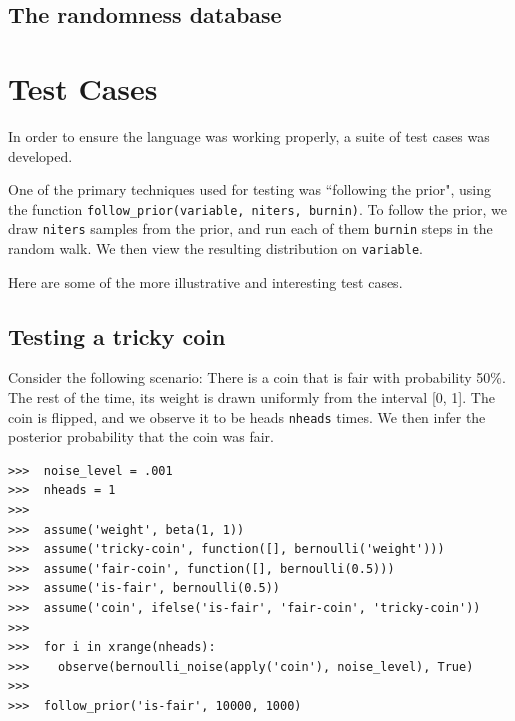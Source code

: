 \documentclass[11pt]{article}
\begin{document}


\subsection{The randomness database}


\pagebreak

\section{Test Cases}

In order to ensure the language was working properly, a suite of test cases was developed.  

One of the primary techniques used for testing was ``following the prior", using the function {\tt follow\_prior(variable, niters, burnin)}.  To follow the prior, we draw {\tt niters} samples from the prior, and run each of them {\tt burnin} steps in the random walk.  We then view the resulting distribution on {\tt variable}.  %

Here are some of the more illustrative and interesting test cases.


\subsection{Testing a tricky coin}

Consider the following scenario:  There is a coin that is fair with probability 50\%.  The rest of the time, its weight is drawn uniformly from the interval [0, 1].  The coin is flipped, and we observe it to be heads {\tt nheads} times.  We then infer the posterior probability that the coin was fair. 

\begin{small}
\begin{verbatim}
>>>  noise_level = .001
>>>  nheads = 1
>>>  
>>>  assume('weight', beta(1, 1))
>>>  assume('tricky-coin', function([], bernoulli('weight')))
>>>  assume('fair-coin', function([], bernoulli(0.5)))
>>>  assume('is-fair', bernoulli(0.5))
>>>  assume('coin', ifelse('is-fair', 'fair-coin', 'tricky-coin')) 
>>>
>>>  for i in xrange(nheads):
>>>    observe(bernoulli_noise(apply('coin'), noise_level), True)
>>>
>>>  follow_prior('is-fair', 10000, 1000)
\end{verbatim}
\end{small}
\end{document}
